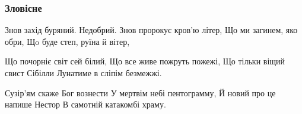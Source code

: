  
 
 

\subsubsection{Зловісне}
\label{sec:poetry.rus.evgen_malanjuk.zlovisne}

Знов захід буряний. Недобрий.
Знов пророкує кров’ю літер,
Що ми загинем, яко обри,
Щo буде степ, руїна й вітер,

Що почорніє світ сей білий,
Що все живе пожруть пожежі,
Що тільки віщий свист Сібілли
Лунатиме в сліпім безмежжі.

Сузір’ям скаже Бог вознести
У мертвім небі пентограмму,
Й новий про це напише Нестор
В самотній катакомбі храму.

